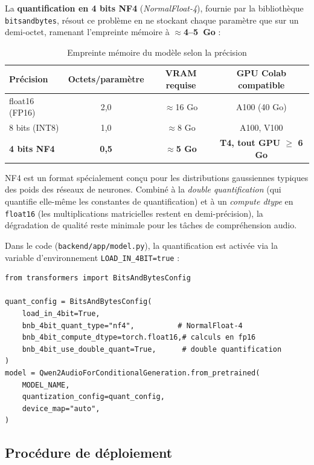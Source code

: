 \documentclass[12pt,a4paper]{report}
\begin{document}
La \textbf{quantification en 4 bits NF4} (\textit{NormalFloat-4}), fournie par la
bibliothèque \texttt{bitsandbytes}, résout ce problème en ne stockant chaque paramètre
que sur un demi-octet, ramenant l'empreinte mémoire à \textbf{$\approx$4--5~Go} :

\begin{table}[h]
\centering
\begin{tabular}{lccc}
\toprule
\textbf{Précision} & \textbf{Octets/paramètre} & \textbf{VRAM requise} & \textbf{GPU Colab compatible} \\
\midrule
float16 (FP16)   & 2,0 & $\approx$16 Go & A100 (40 Go) \\
8 bits (INT8)    & 1,0 & $\approx$8 Go  & A100, V100 \\
\textbf{4 bits NF4} & \textbf{0,5} & \textbf{$\approx$5 Go} & \textbf{T4, tout GPU $\geq$ 6 Go} \\
\bottomrule
\end{tabular}
\caption{Empreinte mémoire du modèle selon la précision}
\end{table}

NF4 est un format spécialement conçu pour les distributions gaussiennes typiques des
poids des réseaux de neurones. Combiné à la \textit{double quantification} (qui
quantifie elle-même les constantes de quantification) et à un \textit{compute dtype}
en \texttt{float16} (les multiplications matricielles restent en demi-précision), la
dégradation de qualité reste minimale pour les tâches de compréhension audio.

Dans le code (\texttt{backend/app/model.py}), la quantification est activée via la
variable d'environnement \texttt{LOAD\_IN\_4BIT=true} :

\begin{lstlisting}[style=python, caption={Configuration BitsAndBytesConfig pour la quantification NF4}]
from transformers import BitsAndBytesConfig

quant_config = BitsAndBytesConfig(
    load_in_4bit=True,
    bnb_4bit_quant_type="nf4",          # NormalFloat-4
    bnb_4bit_compute_dtype=torch.float16,# calculs en fp16
    bnb_4bit_use_double_quant=True,      # double quantification
)
model = Qwen2AudioForConditionalGeneration.from_pretrained(
    MODEL_NAME,
    quantization_config=quant_config,
    device_map="auto",
)
\end{lstlisting}

\subsection{Procédure de déploiement}
\end{document}
